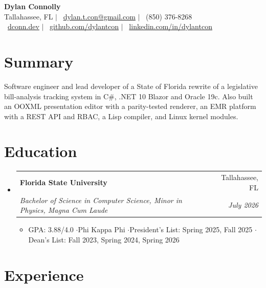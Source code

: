 \documentclass[letterpaper,11pt]{article}
\makeatletter
\newcommand{\iconEnvelope}{\faEnvelope\ }
\newcommand{\iconPhone}{\faPhone\ }
\newcommand{\iconGlobe}{\faGlobe\ }
\newcommand{\iconGithub}{\faGithub\ }
\newcommand{\iconLinkedin}{\faLinkedin\ }
\newcommand{\resumeItem}[1]{\item{\small\linespread{0.90}\selectfont #1\par}}
\newcommand{\resumeSubheading}[4]{
    \item
    \begin{tabular*}{\textwidth}[t]{l@{\extracolsep{\fill}}r@{}}
        \textbf{#1} & #2 \\
        \textit{#3} & \textit{#4} \\
    \end{tabular*}\vspace{-4pt}
}
\newcommand{\resumeSubHeadingListStart}{\begin{itemize}[leftmargin=0pt, label={}]}
\newcommand{\resumeSubHeadingListEnd}{\end{itemize}}
\newcommand{\resumeItemListStart}{\begin{itemize}[leftmargin=12pt, topsep=0pt, itemsep=0pt, label=$\bullet$]}
\newcommand{\resumeItemListEnd}{\end{itemize}\vspace{-6pt}}
\makeatother
\begin{document}
\begin{center}
    {\LARGE \textbf{Dylan Connolly}} \\[4pt]
    Tallahassee, FL \enspace$|$\enspace
    \iconEnvelope\href{mailto:dylan.t.con@gmail.com}{dylan.t.con@gmail.com} \enspace$|$\enspace
    \iconPhone(850) 376-8268 \\[2pt]
    \iconGlobe\href{https://dconn.dev}{dconn.dev} \enspace$|$\enspace
    \iconGithub\href{https://github.com/dylantcon}{github.com/dylantcon} \enspace$|$\enspace
    \iconLinkedin\href{https://linkedin.com/in/dylantcon}{linkedin.com/in/dylantcon}
\end{center}

\section{Summary}
Software engineer and lead developer of a State of Florida rewrite of a legislative bill-analysis tracking system in C\#, .NET 10 Blazor and Oracle 19c. Also built an OOXML presentation editor with a parity-tested renderer, an EMR platform with a REST API and RBAC, a Lisp compiler, and Linux kernel modules.

\section{Education}

\resumeSubHeadingListStart
    \resumeSubheading
        {Florida State University}{Tallahassee, FL}
        {Bachelor of Science in Computer Science, Minor in Physics, Magna Cum Laude}{July 2026}
    \resumeItemListStart
        \resumeItem{GPA: 3.88/4.0 \enspace$\cdot$\enspace Phi Kappa Phi \enspace$\cdot$\enspace President's List: Spring 2025, Fall 2025 \enspace$\cdot$\enspace Dean's List: Fall 2023, Spring 2024, Spring 2026}
    \resumeItemListEnd
\resumeSubHeadingListEnd

\section{Experience}
\end{document}
